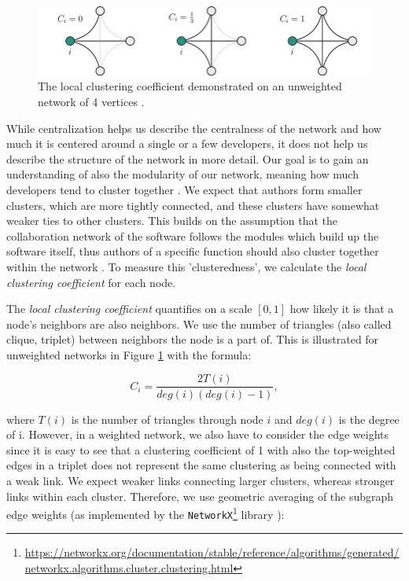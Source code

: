 \begin{figure}[!htbp]
    \centering
    \includegraphics[width=1\textwidth]{figures/loc_clust_coeff.png}
    \caption{The local clustering coefficient demonstrated on an unweighted network of 4 vertices \cite{jedrzejewskiRoleComplexNetworks2016}.}
    \label{fig:loc clust coeff}
\end{figure}

While centralization helps us describe the centralness of the network and how much it is centered around a single or a few developers, it does not help us describe the structure of the network in more detail. Our goal is to gain an understanding of also the modularity of our network, meaning how much developers tend to cluster together \cite{joblinEvolutionaryTrendsDeveloper2017}. We expect that authors form smaller clusters, which are more tightly connected, and these clusters have somewhat weaker ties to other clusters. This builds on the assumption that the collaboration network of the software follows the modules which build up the software itself, thus authors of a specific function should also cluster together within the network \cite{conwayHowCommitteesInvent1968, joblinEvolutionaryTrendsDeveloper2017}. To measure this 'clusteredness', we calculate the \textit{local clustering coefficient} for each node.

The \textit{local clustering coefficient} quantifies on a scale $[0, 1]$ how likely it is that a node's neighbors are also neighbors. We use the number of triangles (also called clique, triplet) between neighbors the node is a part of. This is illustrated for unweighted networks in Figure \ref{fig:loc clust coeff} with the formula:

\[ C_i = \frac{2T(i)}{deg(i)(deg(i)-1)}, \]

where $T(i)$ is the number of triangles through node $i$ and $deg(i)$ is the degree of i. However, in a weighted network, we also have to consider the edge weights since it is easy to see that a clustering coefficient of 1 with also the top-weighted edges in a triplet does not represent the same clustering as being connected with a weak link. We expect weaker links connecting larger clusters, whereas stronger links within each cluster. Therefore, we use geometric averaging of the subgraph edge weights (as implemented by the \texttt{NetworkX}\footnote{\url{https://networkx.org/documentation/stable/reference/algorithms/generated/networkx.algorithms.cluster.clustering.html}} library \cite{onnelaIntensityCoherenceMotifs2005}):

